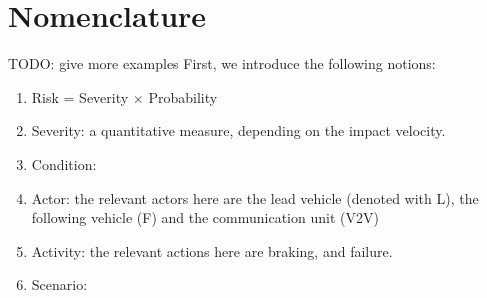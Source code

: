 \section{Nomenclature} %
\label{sec:definitions}

TODO: give more examples
First, we introduce the following notions:
\begin{enumerate}
\item Risk = Severity $\times$ Probability
\item Severity: a quantitative measure, depending on the impact velocity.
\item Condition:
\item Actor: the relevant actors here are the lead vehicle (denoted with L), the following vehicle (F) and the communication unit (V2V)
\item Activity: the relevant actions here are braking, and failure.
\item Scenario:
\end{enumerate}
